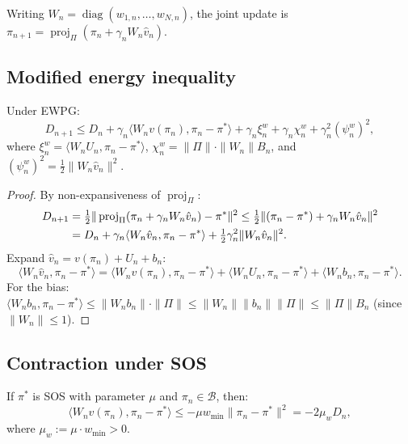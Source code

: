 Writing $W_n = \operatorname{diag}(w_{1,n}, \ldots, w_{N,n})$, the joint update is $\pi_{n+1} = \operatorname{proj}_\Pi(\pi_n + \gamma_n W_n \hat{v}_n)$.


\subsection{Modified energy inequality}

\begin{lemma}
\label{lem:energy-ewpg-ch3}
Under EWPG:
\begin{equation}
\label{eq:energy-ewpg-ch3}
    D_{n+1} \leq D_n + \gamma_n \langle W_n v(\pi_n), \pi_n - \pi^* \rangle + \gamma_n \xi_n^w + \gamma_n \chi_n^w + \gamma_n^2 (\psi_n^w)^2,
\end{equation}
where $\xi_n^w = \langle W_n U_n, \pi_n - \pi^* \rangle$, $\chi_n^w = \|\Pi\| \cdot \|W_n\| B_n$, and $(\psi_n^w)^2 = \frac{1}{2}\|W_n \hat{v}_n\|^2$.
\end{lemma}

\begin{proof}
By non-expansiveness of $\operatorname{proj}_\Pi$:
\begin{align}
    D_{n+1} &= \tfrac{1}{2}\|\operatorname{proj}_\Pi(\pi_n + \gamma_n W_n \hat{v}_n) - \pi^*\|^2 \leq \tfrac{1}{2}\|(\pi_n - \pi^*) + \gamma_n W_n \hat{v}_n\|^2 \notag \\
    &= D_n + \gamma_n \langle W_n \hat{v}_n, \pi_n - \pi^* \rangle + \tfrac{1}{2}\gamma_n^2 \|W_n \hat{v}_n\|^2. \label{eq:ewpg-expand}
\end{align}
Expand $\hat{v}_n = v(\pi_n) + U_n + b_n$:
\[
    \langle W_n \hat{v}_n, \pi_n - \pi^* \rangle = \langle W_n v(\pi_n), \pi_n - \pi^* \rangle + \langle W_n U_n, \pi_n - \pi^* \rangle + \langle W_n b_n, \pi_n - \pi^* \rangle.
\]
For the bias: $\langle W_n b_n, \pi_n - \pi^* \rangle \leq \|W_n b_n\| \cdot \|\Pi\| \leq \|W_n\| \|b_n\| \|\Pi\| \leq \|\Pi\| B_n$ (since $\|W_n\| \leq 1$).
\end{proof}


\subsection{Contraction under SOS}

\begin{lemma}
\label{lem:contraction-ewpg}
If $\pi^*$ is SOS with parameter $\mu$ and $\pi_n \in \mathcal{B}$, then:
\begin{equation}
\label{eq:contraction-ewpg}
    \langle W_n v(\pi_n), \pi_n - \pi^* \rangle \leq -\mu w_{\min} \|\pi_n - \pi^*\|^2 = -2\mu_w D_n,
\end{equation}
where $\mu_w := \mu \cdot w_{\min} > 0$.
\end{lemma}

